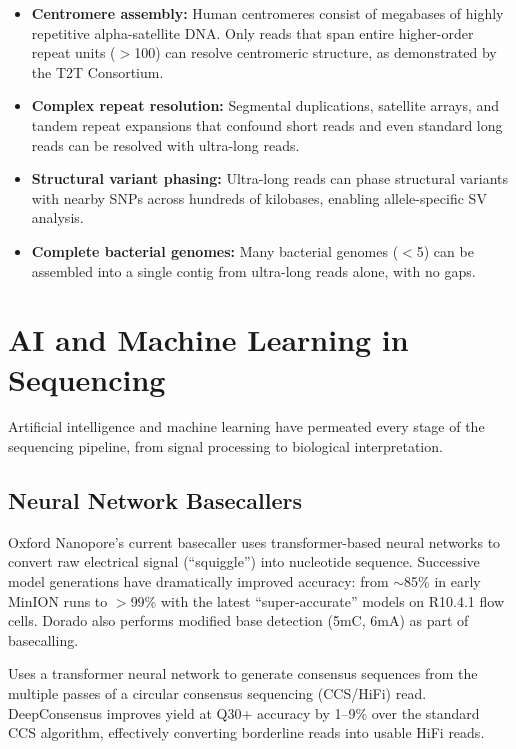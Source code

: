 \begin{itemize}[itemsep=3pt]
  \item \textbf{Centromere assembly:} Human centromeres consist of megabases of highly repetitive alpha-satellite DNA. Only reads that span entire higher-order repeat units ($>$100\kilobase{}) can resolve centromeric structure, as demonstrated by the T2T Consortium.
  \item \textbf{Complex repeat resolution:} Segmental duplications, satellite arrays, and tandem repeat expansions that confound short reads and even standard long reads can be resolved with ultra-long reads.
  \item \textbf{Structural variant phasing:} Ultra-long reads can phase structural variants with nearby SNPs across hundreds of kilobases, enabling allele-specific SV analysis.
  \item \textbf{Complete bacterial genomes:} Many bacterial genomes ($<$5\megabase{}) can be assembled into a single contig from ultra-long reads alone, with no gaps.
\end{itemize}


\section{AI and Machine Learning in Sequencing}
\label{sec:emerging:ai}

Artificial intelligence and machine learning have permeated every stage of the sequencing pipeline, from signal processing to biological interpretation.

\subsection{Neural Network Basecallers}
\label{subsec:emerging:basecallers}

\begin{description}[style=nextline, itemsep=3pt]
  \item[ONT Dorado] Oxford Nanopore's current basecaller uses transformer-based neural networks to convert raw electrical signal (``squiggle'') into nucleotide sequence. Successive model generations have dramatically improved accuracy: from $\sim$85\% in early MinION runs to $>$99\% with the latest ``super-accurate'' models on R10.4.1 flow cells. Dorado also performs modified base detection (5mC, 6mA) as part of basecalling.

  \item[PacBio DeepConsensus] Uses a transformer neural network to generate consensus sequences from the multiple passes of a circular consensus sequencing (CCS/HiFi) read. DeepConsensus improves yield at Q30+ accuracy by 1--9\% over the standard CCS algorithm, effectively converting borderline reads into usable HiFi reads.
\end{description}

